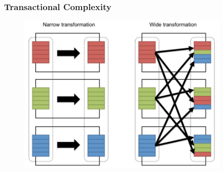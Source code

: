 \documentclass[xcolor={dvipsnames}]{beamer}
\begin{document}
\frame
{
\frametitle{Transactional Complexity}

\begin{figure}
\includegraphics[width=4in]{stuff/spark4.jpg}
\end{figure}


}
\end{document}
